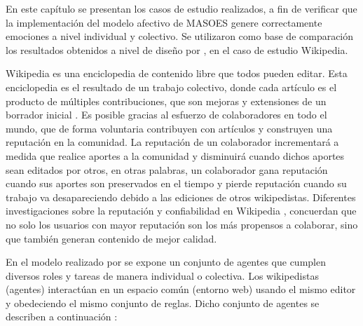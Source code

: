 %
%
%


En este capítulo se presentan los casos de estudio realizados, a fin de verificar que
la implementación del modelo afectivo de MASOES genere correctamente
emociones a nivel individual y colectivo.
Se utilizaron como base de comparación los
resultados obtenidos a nivel de diseño por \cite{perozo2012}, en el caso de
estudio Wikipedia.

Wikipedia es una enciclopedia de contenido libre que todos pueden editar. Esta
enciclopedia es el resultado de un trabajo colectivo, donde cada artículo es el
producto de múltiples contribuciones, que son mejoras y extensiones de un
borrador inicial \citep{perozo2011}.
Es posible gracias al esfuerzo de colaboradores en todo el
mundo, que de forma voluntaria contribuyen con artículos
y construyen una reputación en la comunidad.
La reputación de un colaborador incrementará a medida que realice
aportes a la comunidad y disminuirá cuando dichos aportes sean editados por
otros, en otras palabras, un colaborador gana reputación cuando
sus aportes son preservados en el tiempo y pierde reputación cuando su trabajo
va desapareciendo debido a las ediciones de otros wikipedistas.
Diferentes investigaciones sobre la reputación
y confiabilidad en Wikipedia \citep{anthony2009reputation, javanmardi2009user,
de2011reputation}, concuerdan que no solo los usuarios con mayor reputación son
los más propensos a colaborar, sino que también generan contenido de mejor
calidad.

En el modelo realizado por \cite{perozo2011}
se expone un conjunto de agentes que cumplen diversos roles y tareas de manera individual o colectiva.
Los wikipedistas (agentes) interactúan en un espacio común (entorno web) usando el mismo
editor y obedeciendo el mismo conjunto de reglas.
Dicho conjunto de agentes se describen a continuación :

